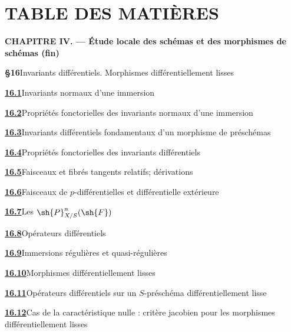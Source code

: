 \clearpage
{}
{}
\section*{TABLE DES MATIÈRES}

\begingroup
\small
\newcommand{\EGAIVcontentsline}[3]{%
  \textbf{#1}\quad #2\dotfill #3\par}

\begin{center}\textbf{CHAPITRE IV. --- Étude locale des schémas et des morphismes de schémas (fin)}\end{center}

\EGAIVcontentsline{\S16}{Invariants différentiels. Morphismes différentiellement lisses}{5}
\EGAIVcontentsline{{\texorpdfstring{\protect\hyperlink{ega4.c04.subsec.16-1}{16.1}}{16.1}}}{Invariants normaux d'une immersion}{5}
\EGAIVcontentsline{{\texorpdfstring{\protect\hyperlink{ega4.c04.subsec.16-2}{16.2}}{16.2}}}{Propriétés fonctorielles des invariants normaux d'une immersion}{9}
\EGAIVcontentsline{{\texorpdfstring{\protect\hyperlink{ega4.c04.subsec.16-3}{16.3}}{16.3}}}{Invariants différentiels fondamentaux d'un morphisme de préschémas}{14}
\EGAIVcontentsline{{\texorpdfstring{\protect\hyperlink{ega4.c04.subsec.16-4}{16.4}}{16.4}}}{Propriétés fonctorielles des invariants différentiels}{16}
\EGAIVcontentsline{{\texorpdfstring{\protect\hyperlink{ega4.c04.subsec.16-5}{16.5}}{16.5}}}{Faisceaux et fibrés tangents relatifs; dérivations}{27}
\EGAIVcontentsline{{\texorpdfstring{\protect\hyperlink{ega4.c04.subsec.16-6}{16.6}}{16.6}}}{Faisceaux de $p$-différentielles et différentielle extérieure}{34}
\EGAIVcontentsline{{\texorpdfstring{\protect\hyperlink{ega4.c04.subsec.16-7}{16.7}}{16.7}}}{Les $\sh{P}^{n}_{X/S}(\sh{F})$}{36}
\EGAIVcontentsline{{\texorpdfstring{\protect\hyperlink{ega4.c04.subsec.16-8}{16.8}}{16.8}}}{Opérateurs différentiels}{39}
\EGAIVcontentsline{{\texorpdfstring{\protect\hyperlink{ega4.c04.subsec.16-9}{16.9}}{16.9}}}{Immersions régulières et quasi-régulières}{46}
\EGAIVcontentsline{{\texorpdfstring{\protect\hyperlink{ega4.c04.subsec.16-10}{16.10}}{16.10}}}{Morphismes différentiellement lisses}{51}
\EGAIVcontentsline{{\texorpdfstring{\protect\hyperlink{ega4.c04.subsec.16-11}{16.11}}{16.11}}}{Opérateurs différentiels sur un $S$-préschéma différentiellement lisse}{53}
\EGAIVcontentsline{{\texorpdfstring{\protect\hyperlink{ega4.c04.subsec.16-12}{16.12}}{16.12}}}{Cas de la caractéristique nulle : critère jacobien pour les morphismes différentiellement lisses}{55}

